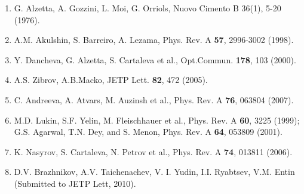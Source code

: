 \begin{enumerate}
\item G. Alzetta, A. Gozzini, L. Moi, G. Orriols, Nuovo Cimento B 36(1), 5-20 (1976).
\item A.M. Akulshin, S. Barreiro, A. Lezama, Phys. Rev. A \textbf{57}, 2996-3002 (1998).
\item Y. Dancheva, G. Alzetta, S. Cartaleva et al., Opt.Commun. \textbf{178}, 103 (2000).
\item A.S. Zibrov, A.B.Macko, JETP Lett. \textbf{82}, 472 (2005).
\item C. Andreeva, A. Atvars, M. Auzinsh et al., Phys. Rev. A \textbf{76}, 063804 (2007).
\item M.D. Lukin, S.F. Yelin, M. Fleischhauer et al., Phys. Rev. A \textbf{60}, 3225 (1999);
G.S. Agarwal, T.N. Dey, and S. Menon, Phys. Rev. A \textbf{64}, 053809 (2001).
\item K. Nasyrov, S. Cartaleva, N. Petrov et al., Phys. Rev. A \textbf{74}, 013811 (2006).
\item D.V. Brazhnikov, A.V. Taichenachev, V. I. Yudin, I.I. Ryabtsev, V.M. Entin (Submitted to JETP Lett, 2010).
\end{enumerate}

\vspace{\baselineskip} 